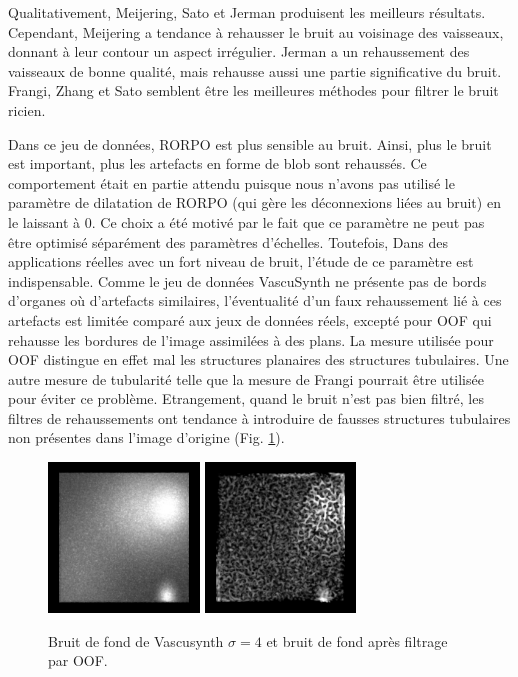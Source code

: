 Qualitativement, Meijering, Sato et Jerman produisent les meilleurs résultats. Cependant, Meijering a tendance à rehausser le bruit au voisinage des vaisseaux, donnant à leur contour un aspect irrégulier. Jerman a un rehaussement des vaisseaux de bonne qualité, mais rehausse aussi une partie significative du bruit. Frangi, Zhang et Sato semblent être les meilleures méthodes pour filtrer le bruit ricien. 

Dans ce jeu de données, RORPO est plus sensible au bruit. Ainsi, plus le bruit est important, plus les artefacts en forme de blob sont rehaussés. Ce comportement était en partie attendu puisque nous n'avons pas utilisé le paramètre de dilatation de RORPO (qui gère les déconnexions liées au bruit) en le laissant à 0. Ce choix a été motivé par le fait que ce paramètre ne peut pas être optimisé séparément des paramètres d'échelles. Toutefois, Dans des applications réelles avec un fort niveau de bruit, l'étude de ce paramètre est indispensable. 
Comme le jeu de données VascuSynth ne présente pas de bords d'organes où d'artefacts similaires, l'éventualité d'un faux rehaussement lié à ces artefacts est limitée comparé aux jeux de données réels, excepté pour OOF qui rehausse les bordures de l'image assimilées à des plans. La mesure utilisée pour OOF distingue en effet mal les structures planaires des structures tubulaires. Une autre mesure de tubularité telle que la mesure de Frangi pourrait être utilisée pour éviter ce problème. Etrangement, quand le bruit n'est pas bien filtré, les filtres de rehaussements ont tendance à introduire de fausses structures tubulaires non présentes dans l'image d'origine (Fig. \ref{fig:noisy_tubes}).

\begin{figure}[H]
  \centering
  \includegraphics[height=4cm]{Images/vascu_noise.png}
  \includegraphics[height=4cm]{Images/vascu_noise_OOF.png}
  \caption{Bruit de fond de Vascusynth $\sigma=4$ et bruit de fond après filtrage par OOF.}
  \label{fig:noisy_tubes}
\end{figure}

